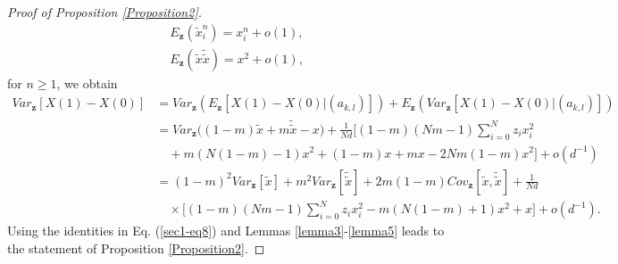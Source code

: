 \documentclass[11pt]{article}
\begin{document}
\begin{proof}[Proof of Proposition \ref{Proposition2}]
\begin{subequations}\label{equation*}
\begin{align}
&E_{\mathbf{z}}\left(\tilde{x}_i^n\right)=x_i^n+o\left(1\right),\\
&E_{\mathbf{z}}\left(\tilde{x}\tilde{\tilde{x}}\right)=x^2+o\left(1\right),
\end{align}
\end{subequations}
for $n\geq 1$, we obtain
\begin{align}\label{sec2-eq29}
Var_{\mathbf{z}}\left[X(1)-X(0)\right]%
&=Var_{\mathbf{z}}\left(E_{\mathbf{z}}\left[X(1)-X(0)\Big|(a_{k,l})\right]\right)
+E_{\mathbf{z}}\left(Var_{\mathbf{z}}\left[X(1)-X(0)\Big|(a_{k,l})\right]\right)\nonumber\\
&=Var_{\mathbf{z}}\Big((1-m)\tilde{x}+m\tilde{\tilde{x}}-x\Big)
+\frac{1}{Nd}\Big[(1-m)(Nm-1)\sum_{i=0}^{N}z_ix^2_i
\nonumber\\
&\quad+m(N(1-m)-1)x^2+(1-m)x+mx
-2Nm(1-m)x^2
\Big]+o\left(d^{-1}\right)\nonumber\\
&=(1-m)^2Var_{\mathbf{z}}\left[\tilde{x}\right]+m^2Var_{\mathbf{z}}\left[\tilde{\tilde{x}}\right]+2m(1-m)Cov_{\mathbf{z}}\left[\tilde{x},\tilde{\tilde{x}}\right]+\frac{1}{Nd}\\
&\quad\times\Big[(1-m)(Nm-1)\sum_{i=0}^{N}z_ix^2_i
-m(N(1-m)+1)x^2+x\Big]+o\left(d^{-1}\right).\nonumber
\end{align}
Using the identities in Eq. (\ref{sec1-eq8}) and Lemmas \ref{lemma3}-\ref{lemma5} leads to the statement of Proposition \ref{Proposition2}.
\end{proof}
\end{document}
